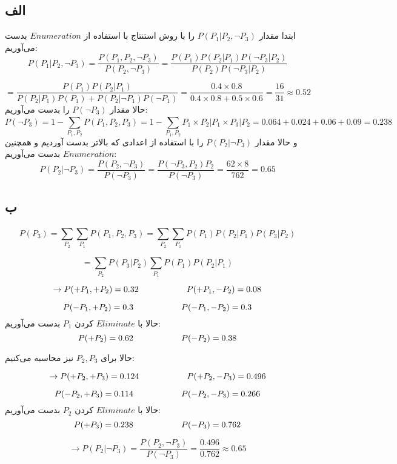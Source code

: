 \subsection*{الف}
ابتدا مقدار 
$P(P_1 | P_2 , \neg P_3)$
را با روش استنتاج با استفاده از
$Enumeration$
 بدست می‌آوریم:
$$
P(P_1 | P_2 , \neg P_3) = \frac{P(P_1 , P_2 , \neg P_3)}{P(P_2 , \neg P_3)} = \frac{P(P_1) P(P_2 | P_1) P(\neg P_3 | P_2)}{P(P_2) P(\neg P_3 | P_2)}
$$

$$
= \frac{P(P_1) P(P_2 | P_1)} {P(P_2 | P_1) P(P_1) + P(P_2 | \neg P_1) P(\neg P_1)} = 
\frac{0.4 \times 0.8}{0.4 \times 0.8 + 0.5 \times 0.6} = \frac{16}{31} \approx 0.52
$$
حالا مقدار 
$P(\neg P_3)$
را بدست می‌آوریم:
$$
P(\neg P_3) = 1 - \sum_{P_1 , P_2}^{} P(P_1 , P_2 , P_3) = 1 - \sum_{P_1 , P_2}^{} P_1 \times P_2 | P_1 \times P_3 | P_2 = 0.064 + 0.024 + 0.06 + 0.09 = 0.238
$$
و حالا مقدار
$P(P_2 | \neg P_3)$
را با استفاده از اعدادی که بالاتر بدست آوردیم و همچنین
$Enumeration$
بدست می‌آوریم:
$$
P(P_2 | \neg P_3) = \frac{P(P_2 , \neg P_3)}{P(\neg P_3)} = \frac{P(\neg P_3 ,  P_2) P_2}{P(\neg P_3)} = \frac{62 \times 8}{762} = 0.65
$$

\subsection*{ب}

$$
P(P_3) = \sum_{P_2}^{} \sum_{P_1}^{} P(P_1 , P_2 , P_3) = \sum_{P_2}^{} \sum_{P_1}^{} P(P_1) P(P_2 | P_1) P(P_3 | P_2)
$$

$$
= \sum_{P_2}^{} P(P_3 | P_2) \sum_{P_1}^{} P(P_1) P(P_2 | P_1)
$$

$$
\rightarrow P(+P_1 , +P_2) = 0.32 \hspace{+2cm}  P(+P_1 , -P_2) = 0.08 
$$

$$
P(-P_1 , +P_2) = 0.3 \hspace{+2cm} P(-P_1 , -P_2) = 0.3
$$
حالا با
$Eliminate$
کردن
$P_1$
بدست می‌آوریم:
$$
P(+P_2) = 0.62 \hspace{+2cm} P(-P_2) = 0.38
$$

حالا برای 
$P_2 , P_3$
نیز محاسبه می‌کنیم:

$$
\rightarrow P(+P_2 , +P_3) = 0.124 \hspace{+2cm}  P(+P_2 , -P_3) = 0.496
$$

$$
P(-P_2 , +P_3) = 0.114 \hspace{+2cm} P(-P_2 , -P_3) = 0.266
$$
حالا با
$Eliminate$
کردن
$P_2$
بدست می‌آوریم:
$$
P(+P_3) = 0.238 \hspace{+2cm} P(-P_3) = 0.762
$$

$$
\rightarrow P(P_2 | \neg P_3) = \frac{P(P_2 , \neg P_3)}{P(\neg P_3)} = \frac{0.496}{0.762} \approx 0.65
$$
